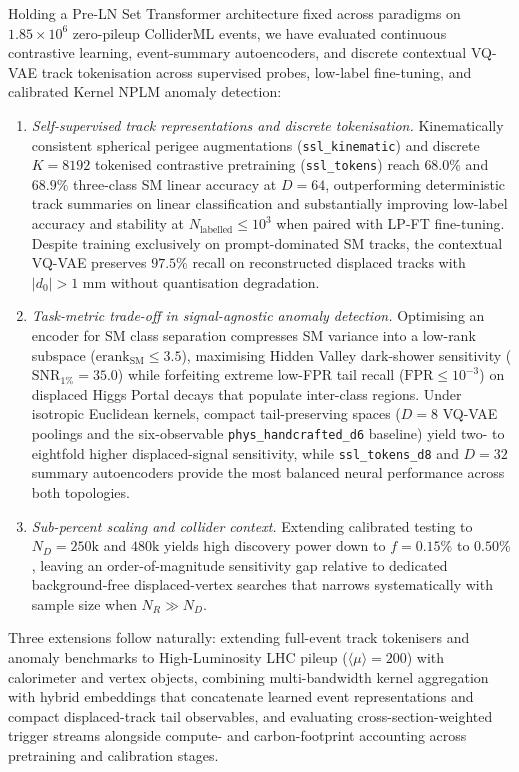 \documentclass{article}
\begin{document}
Holding a Pre-LN Set Transformer architecture fixed across paradigms on $1.85\times 10^6$ zero-pileup ColliderML events, we have evaluated continuous contrastive learning, event-summary autoencoders, and discrete contextual VQ-VAE track tokenisation across supervised probes, low-label fine-tuning, and calibrated Kernel NPLM anomaly detection:
\begin{enumerate}
    \item \emph{Self-supervised track representations and discrete tokenisation.} Kinematically consistent spherical perigee augmentations (\texttt{ssl\_kinematic}) and discrete $K=8192$ tokenised contrastive pretraining (\texttt{ssl\_tokens}) reach $68.0\%$ and $68.9\%$ three-class SM linear accuracy at $D=64$, outperforming deterministic track summaries on linear classification and substantially improving low-label accuracy and stability at $N_{\text{labelled}} \le 10^3$ when paired with LP-FT fine-tuning. Despite training exclusively on prompt-dominated SM tracks, the contextual VQ-VAE preserves $97.5\%$ recall on reconstructed displaced tracks with $|d_0| > 1\text{ mm}$ without quantisation degradation.
    \item \emph{Task-metric trade-off in signal-agnostic anomaly detection.} Optimising an encoder for SM class separation compresses SM variance into a low-rank subspace ($\text{erank}_{\text{SM}} \le 3.5$), maximising Hidden Valley dark-shower sensitivity ($\text{SNR}_{1\%} = 35.0$) while forfeiting extreme low-FPR tail recall ($\text{FPR} \le 10^{-3}$) on displaced Higgs Portal decays that populate inter-class regions. Under isotropic Euclidean kernels, compact tail-preserving spaces ($D=8$ VQ-VAE poolings and the six-observable \texttt{phys\_handcrafted\_d6} baseline) yield two- to eightfold higher displaced-signal sensitivity, while \texttt{ssl\_tokens\_d8} and $D=32$ summary autoencoders provide the most balanced neural performance across both topologies.
    \item \emph{Sub-percent scaling and collider context.} Extending calibrated testing to $N_D = 250\text{k}$ and $480\text{k}$ yields high discovery power down to $f = 0.15\%$ to $0.50\%$, leaving an order-of-magnitude sensitivity gap relative to dedicated background-free displaced-vertex searches that narrows systematically with sample size when $N_R \gg N_D$.
\end{enumerate}

Three extensions follow naturally: extending full-event track tokenisers and anomaly benchmarks to High-Luminosity LHC pileup ($\langle\mu\rangle = 200$) with calorimeter and vertex objects, combining multi-bandwidth kernel aggregation~\cite{GrossoLetizia2024} with hybrid embeddings that concatenate learned event representations and compact displaced-track tail observables, and evaluating cross-section-weighted trigger streams alongside compute- and carbon-footprint accounting across pretraining and calibration stages.
\end{document}
